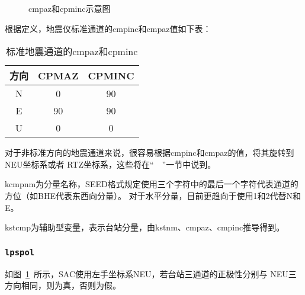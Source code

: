 \begin{figure}[H]
\centering
{}
\caption{cmpaz和cpminc示意图}
\label{fig:cmpaz-cmpinc}
\end{figure}

根据定义，地震仪标准通道的cmpinc和cmpaz值如下表：
\begin{table}[H]
\caption{标准地震通道的cmpaz和cpminc}
\label{table:neu-cmpaz-cmpinc}
\centering
\begin{tabular}{ccc}
\toprule
方向    &   CPMAZ   &   CPMINC      \\
\midrule
N       &   0       &   90          \\
E       &   90      &   90          \\
U       &   0       &   0           \\
\bottomrule
\end{tabular}
\end{table}

对于非标准方向的地震通道来说，很容易根据cmpinc和cmpaz的值，将其旋转到NEU坐标系或者
RTZ坐标系，这些将在``~~''一节中说到。

kcmpnm为分量名称，SEED格式规定使用三个字符中的最后一个字符代表通道的方位（如BHE代表东西向分量）。
对于水平分量，目前更趋向于使用1和2代替N和E。

kstcmp为辅助型变量，表示台站分量，由kstnm、cmpaz、cmpinc推导得到。

\subsubsection{\texttt{lpspol}}
如图~\ref{fig:cmpaz-cmpinc}~所示，SAC使用左手坐标系NEU，若台站三通道的正极性分别与
NEU三方向相同，则为真，否则为假。


